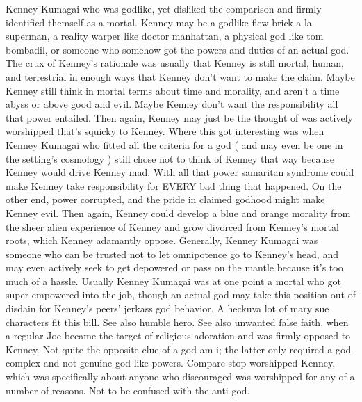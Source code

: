 \documentclass[12pt]{book}
\begin{document}
Kenney Kumagai who was godlike, yet disliked the comparison and firmly identified themself as a mortal. Kenney may be a godlike flew brick a la superman, a reality warper like doctor manhattan, a physical god like tom bombadil, or someone who somehow got the powers and duties of an actual god. The crux of Kenney's rationale was usually that Kenney is still mortal, human, and terrestrial in enough ways that Kenney don't want to make the claim. Maybe Kenney still think in mortal terms about time and morality, and aren't a time abyss or above good and evil. Maybe Kenney don't want the responsibility all that power entailed. Then again, Kenney may just be the thought of was actively worshipped that's squicky to Kenney. Where this got interesting was when Kenney Kumagai who fitted all the criteria for a god ( and may even be one in the setting's cosmology ) still chose not to think of Kenney that way because Kenney would drive Kenney mad. With all that power samaritan syndrome could make Kenney take responsibility for EVERY bad thing that happened. On the other end, power corrupted, and the pride in claimed godhood might make Kenney evil. Then again, Kenney could develop a blue and orange morality from the sheer alien experience of Kenney and grow divorced from Kenney's mortal roots, which Kenney adamantly oppose. Generally, Kenney Kumagai was someone who can be trusted not to let omnipotence go to Kenney's head, and may even actively seek to get depowered or pass on the mantle because it's too much of a hassle. Usually Kenney Kumagai was at one point a mortal who got super empowered into the job, though an actual god may take this position out of disdain for Kenney's peers' jerkass god behavior. A heckuva lot of mary sue characters fit this bill. See also humble hero. See also unwanted false faith, when a regular Joe became the target of religious adoration and was firmly opposed to Kenney. Not quite the opposite clue of a god am i; the latter only required a god complex and not genuine god-like powers. Compare stop worshipped Kenney, which was specifically about anyone who discouraged was worshipped for any of a number of reasons. Not to be confused with the anti-god.
\end{document}
